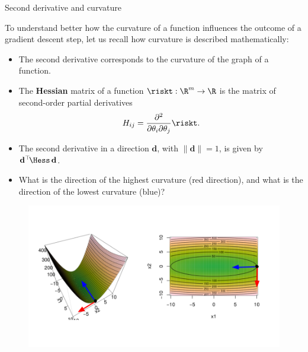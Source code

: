 \begin{vbframe}{Second derivative and curvature}

To understand better how the curvature of a function influences the outcome of a gradient descent step, let us recall how curvature is described mathematically: 

\begin{itemize}
  \item The second derivative corresponds to the curvature of the graph of a function. 
  \item The \textbf{Hessian} matrix of a function $\riskt: \R^m \to \R$ is the matrix of second-order partial derivatives
  $$
    H_{ij} = \frac{\partial^2}{\partial \theta_i \partial \theta_j} \riskt.
  $$
\end{itemize}

\framebreak 

\begin{itemize}
  \item The second derivative in a direction $\mathbf{d}$, %
   with $\|\mathbf{d}\| = 1$, is given by $\mathbf{d}^\top \!\Hess\,\mathbf{d}$.
  \item What is the direction of the highest curvature (red direction), and what is the direction of the lowest curvature (blue)?
\end{itemize}

\vspace*{-0.5cm}

\begin{figure}
\begin{center}
  \includegraphics{plots/curvature2.png}
\end{center}
\end{figure}

\framebreak


\end{vbframe}
